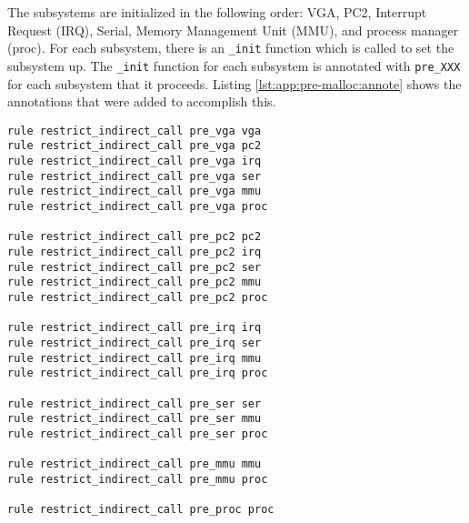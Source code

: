 The subsystems are initialized in the following order: VGA, PC2, Interrupt Request (IRQ), Serial, Memory Management Unit (MMU), and process manager (proc).  For each subsystem, there is an \lstinline{_init} function which is called to set the subsystem up.  The \lstinline{_init} function for each subsystem is annotated with \lstinline{pre_XXX} for each subsystem that it proceeds.  Listing \ref{lst:app:pre-malloc:annote} shows the annotations that were added to accomplish this.

\noindent\begin{minipage}[t]{\linewidth}
\begin{lstlisting}[caption={Rules file for a simple kernel written for CSC454.  The rules written here are intended to prevent code which runs before a subsystem is initialized from calling any function that depend on the subsystem.},label={lst:app:pre-malloc:rules}]
rule restrict_indirect_call pre_vga vga
rule restrict_indirect_call pre_vga pc2
rule restrict_indirect_call pre_vga irq
rule restrict_indirect_call pre_vga ser
rule restrict_indirect_call pre_vga mmu
rule restrict_indirect_call pre_vga proc

rule restrict_indirect_call pre_pc2 pc2
rule restrict_indirect_call pre_pc2 irq
rule restrict_indirect_call pre_pc2 ser
rule restrict_indirect_call pre_pc2 mmu
rule restrict_indirect_call pre_pc2 proc

rule restrict_indirect_call pre_irq irq
rule restrict_indirect_call pre_irq ser
rule restrict_indirect_call pre_irq mmu
rule restrict_indirect_call pre_irq proc

rule restrict_indirect_call pre_ser ser
rule restrict_indirect_call pre_ser mmu
rule restrict_indirect_call pre_ser proc

rule restrict_indirect_call pre_mmu mmu
rule restrict_indirect_call pre_mmu proc

rule restrict_indirect_call pre_proc proc
\end{lstlisting}
\end{minipage}


